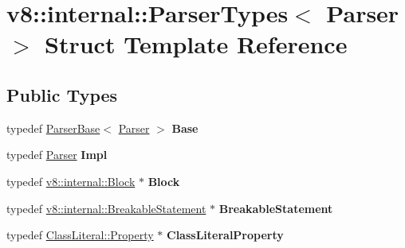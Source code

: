 \hypertarget{structv8_1_1internal_1_1ParserTypes_3_01Parser_01_4}{}\section{v8\+:\+:internal\+:\+:Parser\+Types$<$ Parser $>$ Struct Template Reference}
\label{structv8_1_1internal_1_1ParserTypes_3_01Parser_01_4}
\subsection*{Public Types}
\begin{DoxyCompactItemize}
\item 
\mbox{\label{structv8_1_1internal_1_1ParserTypes_3_01Parser_01_4_afa2e82a08b1140c606fd637d3bdda9e1}} 
typedef \mbox{\hyperlink{classv8_1_1internal_1_1ParserBase}{Parser\+Base}}$<$ \mbox{\hyperlink{classv8_1_1internal_1_1Parser}{Parser}} $>$ {\bfseries Base}
\item 
\mbox{\label{structv8_1_1internal_1_1ParserTypes_3_01Parser_01_4_a6f2b4e78e6d2427abae0281ff44f408a}} 
typedef \mbox{\hyperlink{classv8_1_1internal_1_1Parser}{Parser}} {\bfseries Impl}
\item 
\mbox{\label{structv8_1_1internal_1_1ParserTypes_3_01Parser_01_4_a17663810bb55a74b1188501130a1b63a}} 
typedef \mbox{\hyperlink{classv8_1_1internal_1_1Block}{v8\+::internal\+::\+Block}} $\ast$ {\bfseries Block}
\item 
\mbox{\label{structv8_1_1internal_1_1ParserTypes_3_01Parser_01_4_ad5b8f96c5d270502e04950827fcd0770}} 
typedef \mbox{\hyperlink{classv8_1_1internal_1_1BreakableStatement}{v8\+::internal\+::\+Breakable\+Statement}} $\ast$ {\bfseries Breakable\+Statement}
\item 
\mbox{\label{structv8_1_1internal_1_1ParserTypes_3_01Parser_01_4_a2ec7d2f5471d881340879ea3daaaab05}} 
typedef \mbox{\hyperlink{classv8_1_1internal_1_1ClassLiteralProperty}{Class\+Literal\+::\+Property}} $\ast$ {\bfseries Class\+Literal\+Property}

\end{DoxyCompactItemize}
